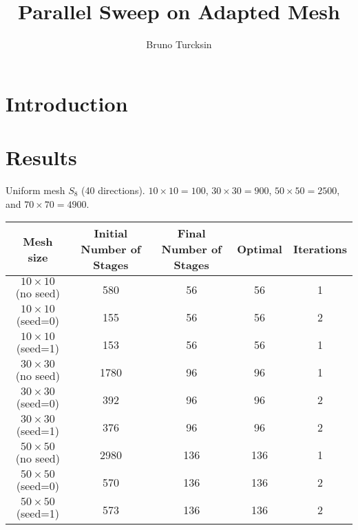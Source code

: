 \documentclass[letterpaper]{article}
\renewcommand{\(}{\left(}
\renewcommand{\)}{\right)}
\renewcommand{\[}{\left[}
\renewcommand{\]}{\right]}
\begin{document}
\title{Parallel Sweep on Adapted Mesh}
\author{Bruno Turcksin} 
\date{}
\maketitle

\section{Introduction}

\section{Results}
Uniform mesh $S_8$ (40 directions). $10\times10=100$, $30\times30=900$,
$50\times50=2500$, and $70\times70=4900$.
\begin{table}[H]
  \begin{center}
    \begin{tabular}{|c|c|c|c|c|}
      \hline
      Mesh size & Initial Number of Stages & Final Number of Stages& Optimal & Iterations \\
      \hline
      $10\times 10$ (no seed) &  580 &  56 &  56 & 1 \\
      $10\times 10$ (seed=0)  &  155 &  56 &  56 & 2 \\
      $10\times 10$ (seed=1)  &  153 &  56 &  56 & 1 \\
      $30\times 30$ (no seed) & 1780 &  96 &  96 & 1 \\
      $30\times 30$ (seed=0)  &  392 &  96 &  96 & 2 \\
      $30\times 30$ (seed=1)  &  376 &  96 &  96 & 2 \\
      $50\times 50$ (no seed) & 2980 & 136 & 136 & 1 \\
      $50\times 50$ (seed=0)  &  570 & 136 & 136 & 2 \\ %
      $50\times 50$ (seed=1)  &  573 & 136 & 136 & 2 \\
    \end{tabular}
  \end{center}
\end{table}
\end{document}
